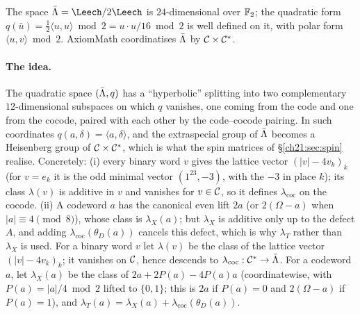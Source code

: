The space $\chXXIL=\Leech/2\Leech$ is $24$-dimensional over $\mathbb{F}_2$; the quadratic form
$q(\bar u)=\tfrac12\langle u,u\rangle\bmod2=u\cdot u/16\bmod 2$ is well defined on it, with polar
form $\langle u,v\rangle\bmod2$.  AxiomMath coordinatises $\bar{\Lambda}$ by $\mathcal{C}\times\mathcal{C}^*$.

\paragraph{The idea.}  The quadratic space $(\bar{\Lambda},q)$ has a ``hyperbolic'' splitting into two
complementary $12$-dimensional subspaces on which $q$ vanishes, one coming from the code and one from
the cocode, paired with each other by the code--cocode pairing.  In such coordinates
$q(a,\delta)=\langle a,\delta\rangle$, and the extraspecial group of $\bar{\Lambda}$ becomes a Heisenberg
group of $\mathcal{C}\times\mathcal{C}^*$, which is what the spin matrices of \S\ref{ch21:sec:spin} realise.
Concretely: (i) every binary word $v$ gives the lattice vector $(|v|-4v_k)_k$ (for $v=e_k$ it is the odd
minimal vector $(1^{23},-3)$, with the $-3$ in place $k$); its class $\lambda(v)$ is additive in $v$ and
vanishes for $v\in\mathcal{C}$, so it defines $\lambda_{\mathrm{coc}}$ on the cocode.  (ii) A codeword $a$ has
the canonical even lift $2a$ (or $2(\Omega-a)$ when $|a|\equiv4\pmod8$), whose class is $\lambda_X(a)$;
but $\lambda_X$ is additive only up to the defect $A$, and adding $\lambda_{\mathrm{coc}}(\theta_D(a))$
cancels this defect, which is why $\lambda_T$ rather than $\lambda_X$ is used.
For a binary word $v$ let $\lambda(v)$ be the class of the lattice vector $(|v|-4v_k)_k$; it vanishes
on $\mathcal{C}$, hence descends to $\lambda_{\mathrm{coc}}:\mathcal{C}^*\to\bar{\Lambda}$.  For a codeword $a$, let
$\lambda_X(a)$ be the class of $2a+2P(a)-4P(a)a$ (coordinatewise, with $P(a)=|a|/4\bmod 2$ lifted to
$\{0,1\}$; this is $2a$ if $P(a)=0$ and $2(\Omega-a)$ if $P(a)=1$), and $\lambda_T(a)=\lambda_X(a)+\lambda_{\mathrm{coc}}(\theta_D(a))$.

